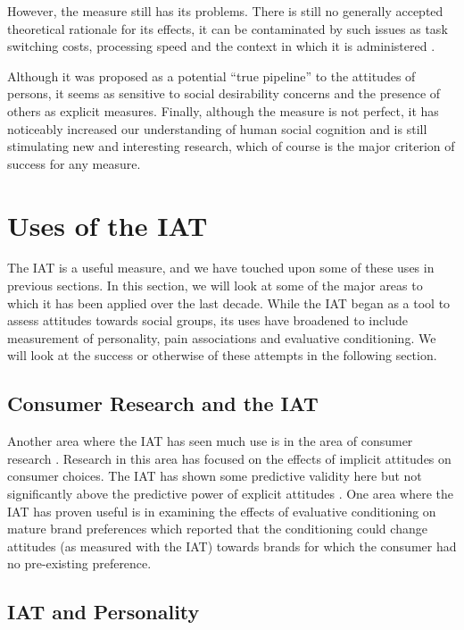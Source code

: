 However, the measure still has its problems. There is still no generally accepted theoretical rationale for its effects, it can be contaminated by such issues as task switching costs\cite{Klauer2005}, processing speed\cite{Blanton2006} and the context in which it is administered \cite{Boysen2006}. 

Although it was proposed as a potential ``true pipeline'' to the attitudes of persons, it seems as sensitive to social desirability concerns and the presence of others as explicit measures. Finally, although the measure is not perfect, it has noticeably increased our understanding of human social cognition and is still stimulating new and interesting research, which of course is the major criterion of success for any measure. 

\section{Uses of the IAT}%
\label{sec:uses-iat}

The IAT is a useful measure, and we have touched upon some of these uses in previous sections. In this section, we will look at some of the major areas to which it has been applied over the last decade. While the IAT began as a tool to assess attitudes towards social groups, its uses have broadened to include measurement of personality, pain associations and evaluative conditioning. We will look at the success or otherwise of these attempts in the following section. 

\subsection{Consumer Research and the IAT}
\label{sec:cons-rese-iat}

Another area where the IAT has seen much use is in the area of consumer research \cite{Lane2007,Maison2001}. Research in this area has focused on the effects of implicit attitudes on consumer choices. The IAT has shown some predictive validity here \cite{Maison2004}  but not significantly above the predictive power of explicit attitudes \cite{Greenwald2009}. One area where the IAT has proven useful is in examining the effects of evaluative conditioning on mature brand preferences \cite{Gibson2008} which reported that the conditioning could change attitudes (as measured with the IAT) towards brands for which the consumer had no pre-existing preference.

\subsection{IAT and Personality}
\label{sec:iat-personality}

